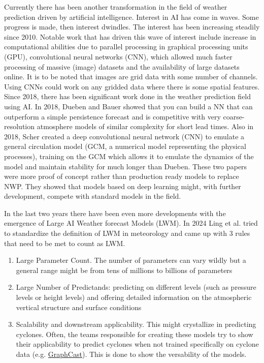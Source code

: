 Currently there has been another transformation in the field of weather prediction driven by artificial intelligence. Interest in AI has come in waves. Some progress is made, then interest dwindles. The interest has been increasing steadily since 2010. Notable work that has driven this wave of interest include increase in computational abilities due to parallel processing in graphical processing units (GPU), convolutional neural networks (CNN), which allowed much faster processing of massive (image) datasets and the availability of large datasets online. It is to be noted that images are grid data with some number of channels. Using CNNs could work on any gridded data where there is some spatial features\cite{canNNBeatNWP}. Since 2018, there has been significant work done in the weather prediction field using AI. In 2018, Dueben and Bauer showed that you can build a NN that can outperform a simple persistence forecast and is competitive with very coarse-resolution atmosphere models of similar complexity for short lead times\cite{dueben2018}. Also in 2018, Scher created a deep convolutional neural network (CNN) to emulate a general circulation model (GCM, a numerical model representing the physical processes), training on the GCM which allows it to emulate the dynamics of the model and maintain stability for much longer than Dueben\cite{scher2018}. These two papers were more proof of concept rather than production ready models to replace NWP. They showed that models based on deep learning might, with further development, compete with standard models in the field. 

In the last two years there have been even more developments with the emergence of Large AI Weather forecast Models (LWM). In 2024 Ling et al. tried to standardize the definition of LWM in meteorology and came up with 3 rules that need to be met to count as LWM.

\begin{enumerate}[label = Rule \arabic*:]
    \item Large Parameter Count. The number of parameters can vary wildly but a general range might be from tens of millions to billions of parameters
    \item Large Number of Predictands: predicting on different levels (such as pressure levels or height levels) and offering detailed information on the atmospheric vertical structure and surface conditions
    \item Scalability and downstream applicability. This might crystallize in predicting cyclones. Often, the teams responsible for creating these models try to show their applicability to predict cyclones when not trained specifically on cyclone data (e.g.  \href{https://www.youtube.com/watch?v=PD1v5PCJs_o&ab_channel=GregBronevetsky}{GraphCast})\cite{SecondRevolution}. This is done to show the versability of the models.
\end{enumerate}

